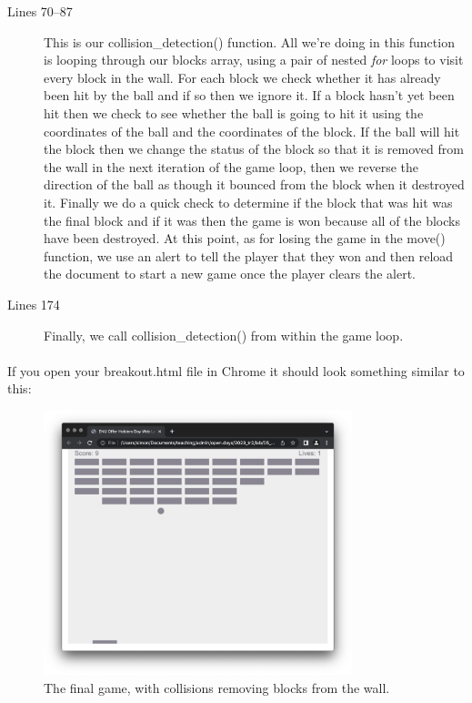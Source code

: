 \documentclass[10pt, a4paper, oneside]{article}
\begin{document}
\begin{description}
\item[Lines 70--87] This is our collision\_detection() function. All we're doing in this function is looping through our blocks array, using a pair of nested \emph{for} loops to visit every block in the wall. For each block we check whether it has already been hit by the ball and if so then we ignore it. If a block hasn't yet been hit then we check to see whether the ball is going to hit it using the coordinates of the ball and the coordinates of the block. If the ball will hit the block then we change the status of the block so that it is removed from the wall in the next iteration of the game loop, then we reverse the direction of the ball as though it bounced from the block when it destroyed it. Finally we do a quick check to determine if the block that was hit was the final block and if it was then the game is won because all of the blocks have been destroyed. At this point, as for losing the game in the move() function, we use an alert to tell the player that they won and then reload the document to start a new game once the player clears the alert.
\item[Lines 174] Finally, we call collision\_detection() from within the game loop.
\end{description}

\paragraph{} If you open your breakout.html file in Chrome it should look something similar to this:

\begin{figure}[H]
\centering
\includegraphics[width=0.8\textwidth]{images/05_collisions+collisions.png}
\caption{The final game, with collisions removing blocks from the wall.}
\label{fig:05_collisions+collisions}
\end{figure}
\end{document}

